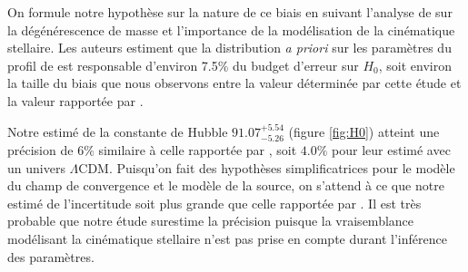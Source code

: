 \documentclass[times,10pt,twocolumn]{article}
\begin{document}
On formule notre hypothèse sur la nature de ce biais en suivant l'analyse de 
\citet{Birrer2016} sur la dégénérescence de masse et l'importance de la modélisation 
de la cinématique stellaire. Les auteurs estiment que la distribution \textit{a priori} 
sur les paramètres du profil de \citet{Hernquist1990} est responsable d'environ 
7.5\% du budget d'erreur sur $H_0$, soit environ la taille du biais que nous observons 
entre la valeur déterminée par cette étude et la valeur rapportée par 
\citet{Suyu2013}. 

Notre estimé de la constante de Hubble $91.07^{+5.54}_{-5.26}$ (figure \ref{fig:H0})
atteint une précision de $6\%$ similaire à celle rapportée 
par \citet{Suyu2013}, soit $4.0\%$ pour leur estimé avec un univers $\Lambda$CDM. Puisqu'on 
fait des hypothèses simplificatrices pour le modèle du champ de convergence et le 
modèle de la source, on s'attend à ce que notre estimé de l'incertitude soit 
plus grande que celle rapportée par \citet{Suyu2013}. Il est très probable 
que notre étude surestime la précision puisque la vraisemblance modélisant la cinématique 
stellaire n'est pas prise en compte durant l'inférence des paramètres.

\end{document}
